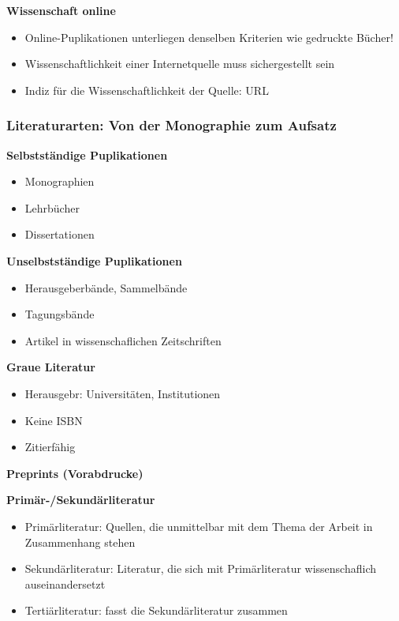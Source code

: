 \textbf{Wissenschaft online}

\begin{itemize}%
\item
  Online-Puplikationen unterliegen denselben Kriterien wie gedruckte
  Bücher!
\item
  Wissenschaftlichkeit einer Internetquelle muss sichergestellt sein
\item
  Indiz für die Wissenschaftlichkeit der Quelle: URL
\end{itemize}

\subsubsection{Literaturarten: Von der Monographie zum
Aufsatz}\label{literaturarten-von-der-monographie-zum-aufsatz}

\textbf{Selbstständige Puplikationen}

\begin{itemize}%
\item
  Monographien
\item
  Lehrbücher
\item
  Dissertationen
\end{itemize}

\textbf{Unselbstständige Puplikationen}

\begin{itemize}%
\item
  Herausgeberbände, Sammelbände
\item
  Tagungsbände
\item
  Artikel in wissenschaflichen Zeitschriften
\end{itemize}

\textbf{Graue Literatur}

\begin{itemize}%
\item
  Herausgebr: Universitäten, Institutionen
\item
  Keine ISBN
\item
  Zitierfähig
\end{itemize}

\textbf{Preprints (Vorabdrucke)}

\textbf{Primär-/Sekundärliteratur}

\begin{itemize}%
\item
  Primärliteratur: Quellen, die unmittelbar mit dem Thema der Arbeit in
  Zusammenhang stehen
\item
  Sekundärliteratur: Literatur, die sich mit Primärliteratur
  wissenschaflich auseinandersetzt
\item
  Tertiärliteratur: fasst die Sekundärliteratur zusammen
\end{itemize}


